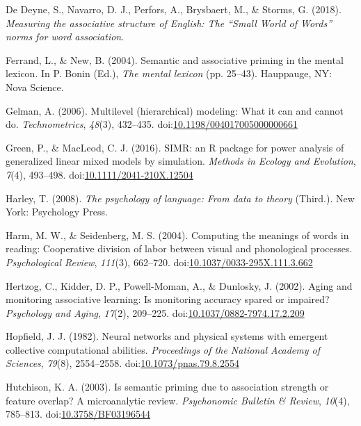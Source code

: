 \documentclass[english,man]{apa6}
\theoremstyle{definition}
\theoremstyle{definition}
\theoremstyle{definition}
\theoremstyle{remark}
\begin{document}
\hypertarget{ref-DeDeyne2018}{}
De Deyne, S., Navarro, D. J., Perfors, A., Brysbaert, M., \& Storms, G.
(2018). \emph{Measuring the associative structure of English: The
``Small World of Words'' norms for word association}.

\hypertarget{ref-Ferrand2004}{}
Ferrand, L., \& New, B. (2004). Semantic and associative priming in the
mental lexicon. In P. Bonin (Ed.), \emph{The mental lexicon} (pp.
25--43). Hauppauge, NY: Nova Science.

\hypertarget{ref-Gelman2006}{}
Gelman, A. (2006). Multilevel (hierarchical) modeling: What it can and
cannot do. \emph{Technometrics}, \emph{48}(3), 432--435.
doi:\href{https://doi.org/10.1198/004017005000000661}{10.1198/004017005000000661}

\hypertarget{ref-Green2016}{}
Green, P., \& MacLeod, C. J. (2016). SIMR: an R package for power
analysis of generalized linear mixed models by simulation. \emph{Methods
in Ecology and Evolution}, \emph{7}(4), 493--498.
doi:\href{https://doi.org/10.1111/2041-210X.12504}{10.1111/2041-210X.12504}

\hypertarget{ref-Harley2008}{}
Harley, T. (2008). \emph{The psychology of language: From data to
theory} (Third.). New York: Psychology Press.

\hypertarget{ref-Harm2004}{}
Harm, M. W., \& Seidenberg, M. S. (2004). Computing the meanings of
words in reading: Cooperative division of labor between visual and
phonological processes. \emph{Psychological Review}, \emph{111}(3),
662--720.
doi:\href{https://doi.org/10.1037/0033-295X.111.3.662}{10.1037/0033-295X.111.3.662}

\hypertarget{ref-Hertzog2002}{}
Hertzog, C., Kidder, D. P., Powell-Moman, A., \& Dunlosky, J. (2002).
Aging and monitoring associative learning: Is monitoring accuracy spared
or impaired? \emph{Psychology and Aging}, \emph{17}(2), 209--225.
doi:\href{https://doi.org/10.1037/0882-7974.17.2.209}{10.1037/0882-7974.17.2.209}

\hypertarget{ref-Hopfield1982}{}
Hopfield, J. J. (1982). Neural networks and physical systems with
emergent collective computational abilities. \emph{Proceedings of the
National Academy of Sciences}, \emph{79}(8), 2554--2558.
doi:\href{https://doi.org/10.1073/pnas.79.8.2554}{10.1073/pnas.79.8.2554}

\hypertarget{ref-Hutchison2003}{}
Hutchison, K. A. (2003). Is semantic priming due to association strength
or feature overlap? A microanalytic review. \emph{Psychonomic Bulletin
\& Review}, \emph{10}(4), 785--813.
doi:\href{https://doi.org/10.3758/BF03196544}{10.3758/BF03196544}
\end{document}
